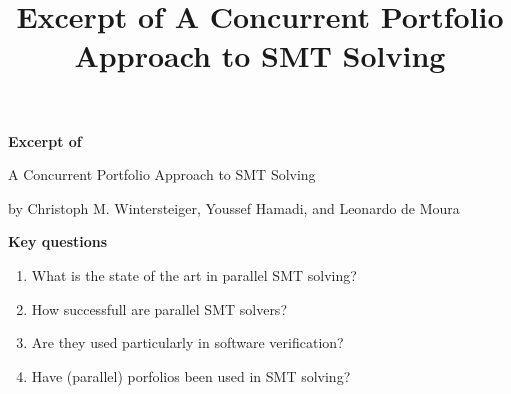 \documentclass{scrartcl}
\title{Excerpt of A Concurrent Portfolio Approach to SMT Solving}
\begin{document}
\begin{center}
    \Large{\textbf{Excerpt of}}

    \LARGE{A Concurrent Portfolio Approach to SMT Solving}

    \large{by Christoph M. Wintersteiger, Youssef Hamadi, and Leonardo de Moura}
\end{center}

\vspace{1cm}

\begin{addmargin}[0.2\linewidth]{0.2\linewidth}
    \begin{center}
        \textbf{Key questions}
    \end{center}
    \begin{enumerate}[i]
        \item What is the state of the art in parallel SMT solving?
        \item How successfull are parallel SMT solvers?
        \item Are they used particularly in software verification?
        \item Have (parallel) porfolios been used in SMT solving?
    \end{enumerate}
\end{addmargin}

\vspace{1cm}
\end{document}
